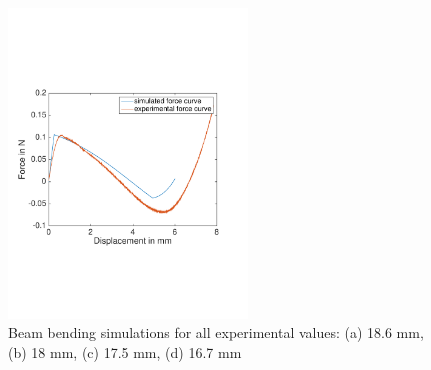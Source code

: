 \documentclass[10pt]{article}
\begin{document}
\begin{figure}[h]
\includegraphics[width=2.5in]{34p5ShearModulusp2}
\caption{Beam bending simulations for all experimental values: (a) 18.6 mm, (b) 18 mm, (c) 17.5 mm, (d) 16.7 mm}
\label{fig:simulationNewWithShearModulus}
\end{figure}
\end{document}
